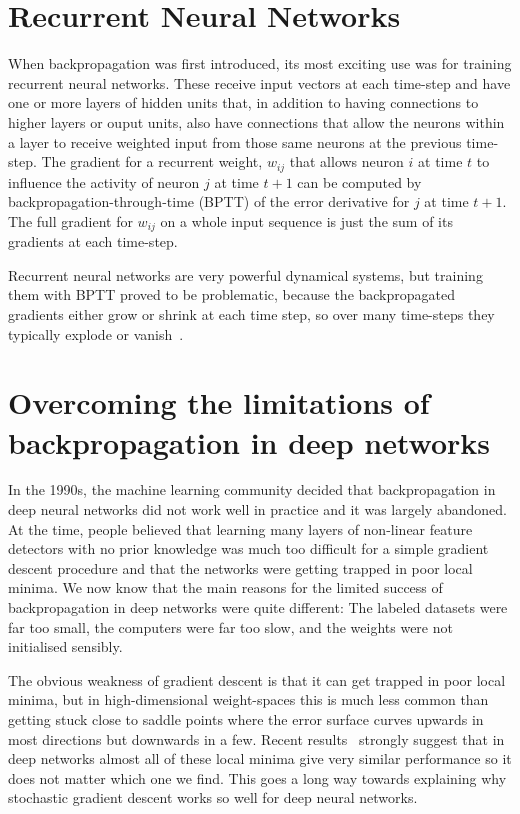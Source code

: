 \documentclass[]{article}
\begin{document}
\section{Recurrent Neural Networks}

When backpropagation was first introduced, its most exciting use was for
training recurrent neural networks. These receive input vectors at each
time-step and have one or more layers of hidden units that, in addition to
having connections to higher layers or ouput units, also have connections
that allow the neurons within a layer to receive weighted input from those
same neurons at the previous time-step.  The gradient for a recurrent
weight, $w_{ij}$ that allows neuron $i$ at time $t$ to influence the
activity of neuron $j$ at time $t+1$ can be computed by
backpropagation-through-time (BPTT) of the error derivative for $j$ at time
$t+1$. The full gradient for $w_{ij}$ on a whole input sequence is just the
sum of its gradients at each time-step.

Recurrent neural networks are very powerful dynamical systems, but training
them with BPTT proved to be problematic, because the backpropagated
gradients either grow or shrink at each time step, so over many time-steps
they typically explode or vanish~\cite{Bengio-trnn93-small,Hochreiter91-small}.

\section{Overcoming the limitations of backpropagation in deep networks}

In the 1990s, the machine learning community decided that backpropagation
in deep neural networks did not work well in practice and it was largely
abandoned.  At the time, people believed that learning many layers of
non-linear feature detectors with no prior knowledge was much too difficult
for a simple gradient descent procedure and that the networks were getting
trapped in poor local minima. We now know that the main reasons for the
limited success of backpropagation in deep networks were quite different:
The labeled datasets were far too small, the computers were far too slow,
and the weights were not initialised sensibly.

The obvious weakness of gradient descent is that it can get trapped in poor
local minima, but in high-dimensional weight-spaces this is much less
common than getting stuck close to saddle points where the error surface
curves upwards in most directions but downwards in a few. Recent
results~\cite{Dauphin-et-al-NIPS2014-small,Yann} strongly suggest
that in deep networks almost all of these local minima give very similar
performance so it does not matter which one we find.  This goes a long way
towards explaining why stochastic gradient descent works so well for deep
neural networks.
\end{document}

